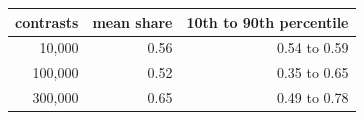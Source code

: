 \begin{tabular}{rrr}
\toprule
contrasts & mean share & 10th to 90th percentile \\
\midrule
10,000 & 0.56 & 0.54 to 0.59 \\
100,000 & 0.52 & 0.35 to 0.65 \\
300,000 & 0.65 & 0.49 to 0.78 \\
\bottomrule
\end{tabular}
